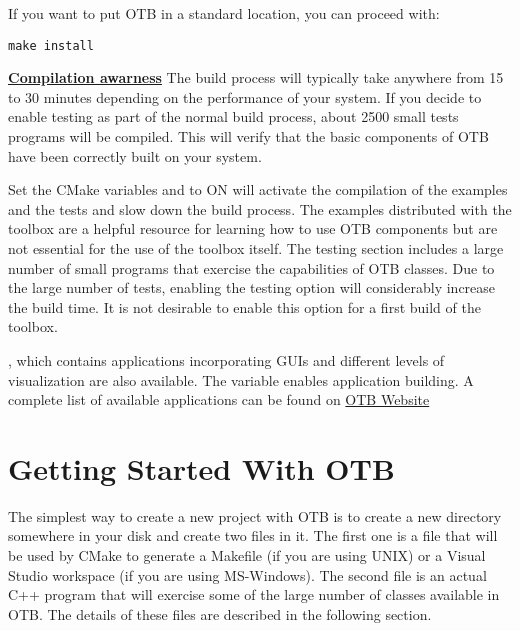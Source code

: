 If you want to put OTB in a standard location, you can proceed with:

\begin{verbatim}
make install
\end{verbatim}

\textbf{\underline{Compilation awarness}}
The build process will typically take anywhere from 15 to 30 minutes depending
on the performance of your system. If you decide to enable testing as part of
the normal build process, about 2500 small tests programs will be compiled. This
will verify that the basic components of OTB have been correctly built on your
system.

Set the CMake variables  and  to ON will activate 
the compilation of the examples and the tests and slow down the build process.
The examples distributed with the toolbox are a helpful resource for learning how to use OTB
components but are not essential for the use of the toolbox itself. The testing
section includes a large number of small programs that exercise the
capabilities of OTB classes. Due to the large number of tests, enabling the
testing option will considerably increase the build time.  It is not
desirable to enable this option for a first build of the toolbox.

, which contains applications incorporating GUIs and different levels
of visualization are also available. The variable  enables 
application building. A complete list of available applications can be found 
on \href{http://orfeo-toolbox.org/Applications/index.html}{OTB Website}



\section{Getting Started With OTB }
\label{sec:GettingStartedWithOTB}

The simplest way to create a new project with OTB is to create a new directory
somewhere in your disk and create two files in it. The first one is a
 file that will be used by CMake to generate a Makefile
(if you are using UNIX) or a Visual Studio workspace (if you are using
MS-Windows).  The second file is an actual C++ program that will exercise
some of the large number of classes available in OTB. The details of these files
are described in the following section.

